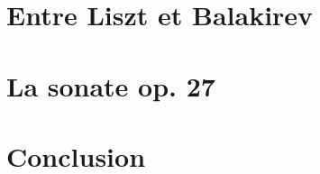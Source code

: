 \documentclass[]{music}
\begin{document}




\newpage
\strut\thispagestyle{empty}
\newpage





\newpage
\tableofcontents
\newpage
\strut\thispagestyle{empty}
\newpage
\strut\thispagestyle{empty}
\newpage


\part*{Entre Liszt et Balakirev}




\part*{La sonate op. 27}




\part*{Conclusion}




\newpage
\strut\thispagestyle{empty}
\newpage





\end{document}
